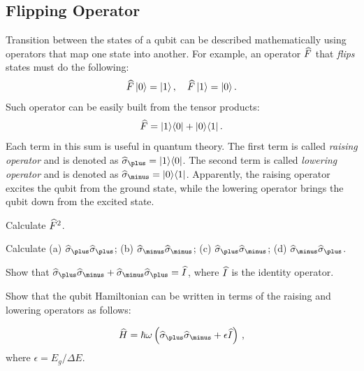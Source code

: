 \subsection{Flipping Operator}
Transition between the states of a qubit can be described mathematically using operators that map one state into another. For example, an operator $\widehat{F}$ that \emph{flips} states must do the following:
\[
\widehat{F}\,|{0}\rangle=|{1}\rangle\,,\quad \widehat{F}\,|{1}\rangle=|{0}\rangle\,.
\]
Such operator can be easily built from the tensor products:
\[
\widehat{F} = |{1}\rangle\langle{0}|+|{0}\rangle\langle{1}|\,.
\]
Each term in this sum is useful in quantum theory. The first term is called \emph{raising operator} and is denoted as 
$ \op{\sigma}_\plus=\ketbra{1}{0}$. The second term is called \emph{lowering operator} and is denoted as $ \op{\sigma}_\minus=\ketbra{0}{1}$. Apparently, the raising operator excites the qubit from the ground state, while the lowering operator brings the qubit down from the excited state.
\begin{exercise}
	Calculate $\widehat{F}^2$.
\end{exercise}
\begin{exercise}
	Calculate (a) $\op{\sigma}_\plus \op{\sigma}_\plus$; (b) $\op{\sigma}_\minus \op{\sigma}_\minus$; (c) $\op{\sigma}_\plus \op{\sigma}_\minus$; (d) $\op{\sigma}_\minus \op{\sigma}_\plus$.
\end{exercise}

\begin{exercise}
	Show that  $\op{\sigma}_\plus \op{\sigma}_\minus+\op{\sigma}_\minus \op{\sigma}_\plus=\op{I}$, where $\widehat{I}$ is the identity operator.
\end{exercise}

\begin{exercise}
	Show that the qubit Hamiltonian can be written in terms of the raising and lowering operators as follows:
	
	\[
	\op{H} = \hbar\omega\left(\op{\sigma}_\plus \op{\sigma}_\minus+\epsilon\op{I} \right)\,,
	\]
	where $\epsilon=E_g/\Delta E$.
\end{exercise}

